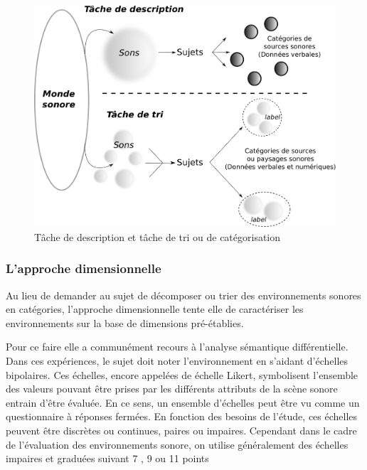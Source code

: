 \begin{figure}[bth]
        \myfloatalign
        \includegraphics[width=\linewidth]{gfx/desCat}
        \caption{Tâche de description et tâche de tri ou de catégorisation}\label{fig:descat}
\end{figure}


\subsubsection{L'approche dimensionnelle}

Au lieu de demander au sujet de décomposer ou trier des environnements sonores en catégories, l'approche dimensionnelle tente elle de caractériser les environnements sur la base de dimensions pré-établies. 

Pour ce faire elle a communément recours à l'analyse sémantique différentielle. Dans ces expériences, le sujet doit noter l'environnement en s'aidant d'échelles bipolaires. Ces échelles, encore appelées de échelle Likert, symbolisent l'ensemble des valeurs pouvant être prises par les différents attributs de la scène sonore entrain d'être évaluée. En ce sens, un ensemble d'échelles peut être vu comme un questionnaire à réponses fermées. En fonction des besoins de l'étude, ces échelles peuvent être discrètes ou continues, paires ou impaires. Cependant dans le cadre de l'évaluation des environnements sonore, on utilise généralement des échelles impaires et graduées suivant 7 \citep{raimbault2006qualitative}, 9 \citep{hall2013exploratory} ou 11 points \citep{ricciardi2015sound}

